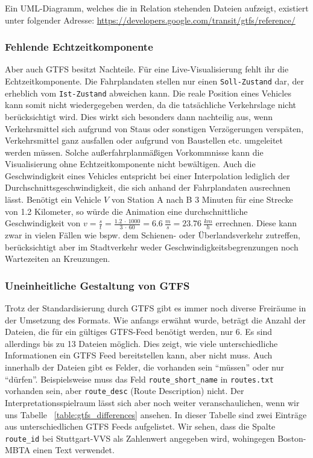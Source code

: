       Ein UML-Diagramm, welches die in Relation stehenden Dateien aufzeigt, existiert unter folgender Adresse: \url{https://developers.google.com/transit/gtfs/reference/} 

      \subsubsection*{Fehlende Echtzeitkomponente}
      \label{ssub:fehlende_echtzeitkomponente}
        Aber auch GTFS besitzt Nachteile. Für eine Live-Visualisierung fehlt ihr die Echtzeitkomponente. Die Fahrplandaten stellen nur einen \texttt{Soll-Zustand} dar, der erheblich vom \texttt{Ist-Zustand} abweichen kann. Die reale Position eines Vehicles kann somit nicht wiedergegeben werden, da die tatsächliche Verkehrslage nicht berücksichtigt wird. Dies wirkt sich besonders dann nachteilig aus, wenn Verkehrsmittel sich aufgrund von Staus oder sonstigen Verzögerungen verspäten, Verkehrsmittel ganz ausfallen oder aufgrund von Baustellen etc. umgeleitet werden müssen. Solche außerfahrplanmäßigen Vorkommnisse kann die Visualisierung ohne Echtzeitkomponente nicht bewältigen.
        Auch die Geschwindigkeit eines Vehicles entspricht bei einer Interpolation lediglich der Durchschnittsgeschwindigkeit, die sich anhand der Fahrplandaten ausrechnen lässt. Benötigt ein Vehicle $V$ von Station A nach B 3 Minuten für eine Strecke von 1.2 Kilometer, so würde die Animation eine durchschnittliche Geschwindigkeit von $v = \frac{s}{t} = \frac{1.2 \: \cdot \: 1000}{3 \: \cdot \: 60} = 6.6 \: \frac{m}{s} = 23.76 \: \frac{km}{h}$ errechnen. Diese kann zwar in vielen Fällen wie bspw. dem Schienen- oder Überlandsverkehr zutreffen, berücksichtigt aber im Stadtverkehr weder Geschwindigkeitsbegrenzungen noch Wartezeiten an Kreuzungen. 


      \subsubsection*{Uneinheitliche Gestaltung von GTFS}
      \label{ssub:uneinheitliche_gestaltung_von_gtfs}
        Trotz der Standardisierung durch GTFS gibt es immer noch diverse Freiräume in der Umsetzung des Formats. Wie anfangs erwähnt wurde, beträgt die Anzahl der Dateien, die für ein gültiges GTFS-Feed benötigt werden, nur 6. Es sind allerdings bis zu 13 Dateien möglich. Dies zeigt, wie viele unterschiedliche Informationen ein GTFS Feed bereitstellen kann, aber nicht muss. 
        Auch innerhalb der Dateien gibt es Felder, die vorhanden sein "`müssen"' oder nur "`dürfen"'. Beispielsweise muss das Feld \texttt{route\_short\_name} in \texttt{routes.txt} vorhanden sein, aber \texttt{route\_desc} (Route Description) nicht. Der Interpretationsspielraum lässt sich aber noch weiter veranschaulichen, wenn wir uns Tabelle ~\ref{table:gtfs_differences} ansehen. In dieser Tabelle sind zwei Einträge aus unterschiedlichen GTFS Feeds aufgelistet.
        Wir sehen, dass die Spalte \texttt{route\_id} bei Stuttgart-VVS als Zahlenwert angegeben wird, wohingegen Boston-MBTA einen Text verwendet.

